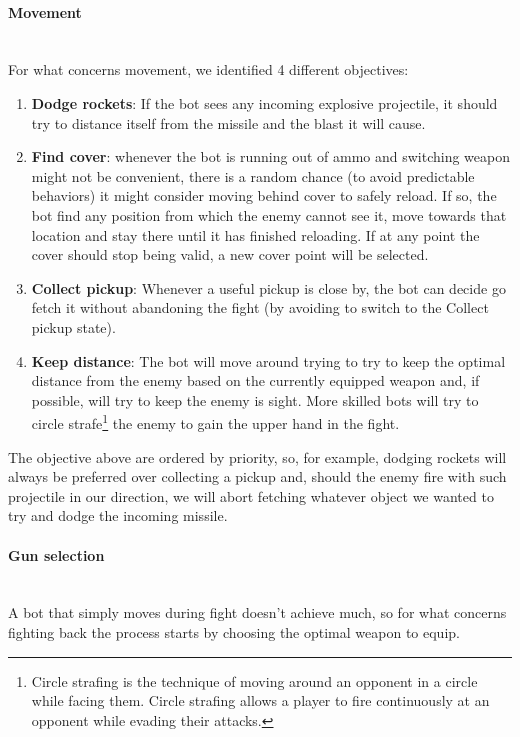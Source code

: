\paragraph{Movement}\mbox{}\\
For what concerns movement, we identified 4 different objectives:

\begin{enumerate}
\item \textbf{Dodge rockets}: If the bot sees any incoming explosive projectile, it should try to distance itself from the missile and the blast it will cause.
\item \textbf{Find cover}: whenever the bot is running out of ammo and switching weapon might not be convenient, there is a random chance (to avoid predictable behaviors) it might consider moving behind cover to safely reload. If so, the bot find any position from which the enemy cannot see it, move towards that location and stay there until it has finished reloading. If at any point the cover should stop being valid, a new cover point will be selected.
\item \textbf{Collect pickup}: Whenever a useful pickup is close by, the bot can decide go fetch it without abandoning the fight (by avoiding to switch to the Collect pickup state). 
\item \textbf{Keep distance}: The bot will move around trying to try to keep the optimal distance from the enemy based on the currently equipped weapon and, if possible, will try to keep the enemy is sight. More skilled bots will try to circle strafe\footnote{Circle strafing is the technique of moving around an opponent in a circle while facing them. Circle strafing allows a player to fire continuously at an opponent while evading their attacks.} the enemy to gain the upper hand in the fight.
\end{enumerate}

The objective above are ordered by priority, so, for example, dodging rockets will always be preferred over collecting a pickup and, should the enemy fire with such projectile in our direction, we will abort fetching whatever object we wanted to try and dodge the incoming missile.

\paragraph{Gun selection}\mbox{}\\
A bot that simply moves during fight doesn’t achieve much, so for what concerns fighting back the process starts by choosing the optimal weapon to equip.

